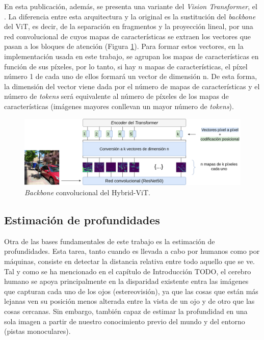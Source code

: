 En esta publicación, además, se presenta una variante del \textit{Vision Transformer}, el . La diferencia entre esta arquitectura y la original es la sustitución del \textit{backbone} del ViT, es decir, de la separación en fragmentos y la proyección lineal, por una red convolucional de cuyos mapas de características se extraen los vectores que pasan a los bloques de atención (Figura \ref{fig:hybrid-vit}). Para formar estos vectores, en la implementación usada en este trabajo, se agrupan los mapas de características en función de sus píxeles, por lo tanto, si hay $n$ mapas de características, el píxel número 1 de cada uno de ellos formará un vector de dimensión n. De esta forma, la dimensión del vector viene dada por el número de mapas de características y el número de \textit{tokens} será equivalente al número de píxeles de los mapas de características (imágenes mayores conllevan un mayor número de \textit{tokens}).

\begin{figure}[H]
\centering
\includegraphics[width=1\linewidth]{imagenes/vit-hybrid.png} 
\captionsetup{width=.8\linewidth}
\caption{\textit{Backbone} convolucional del Hybrid-ViT.}
\label{fig:hybrid-vit}
\end{figure}

\subsection{Estimación de profundidades}
Otra de las bases fundamentales de este trabajo es la estimación de profundidades. Esta tarea, tanto cuando es llevada a cabo por humanos como por máquinas, consiste en detectar la distancia relativa entre todo aquello que se ve. Tal y como se ha mencionado en el capítulo de Introducción TODO, el cerebro humano se apoya principalmente en la disparidad existente entra las imágenes que capturan cada uno de los ojos (estereovisión), ya que las cosas que están más lejanas ven su posición menos alterada entre la vista de un ojo y de otro que las cosas cercanas. Sin embargo, también capaz de estimar la profundidad en una sola imagen a partir de nuestro conocimiento previo del mundo y del entorno (pistas monoculares). 

